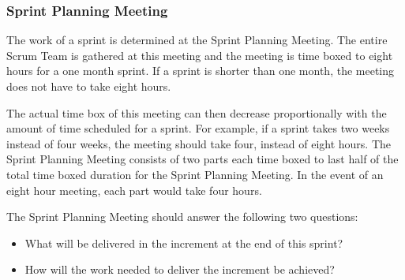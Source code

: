 \subsubsection{Sprint Planning Meeting}

The work of a sprint is determined at the Sprint Planning Meeting. The entire Scrum Team is 
gathered at this meeting and the meeting is time boxed to eight hours for a one
month sprint. If a sprint is shorter than one month, the meeting does not have
to take eight hours\cite{scrumguide11}. 


The actual time box of this meeting can then decrease proportionally with the amount of time 
scheduled for a sprint. For example, if a sprint takes two weeks instead of four
weeks, the meeting should take four, instead of eight
hours\cite{scrumguide11}.  The Sprint Planning Meeting consists of two parts each time boxed to last half of the total time boxed duration 
for the Sprint Planning Meeting. In the event of an eight hour meeting, each
part would take four hours\cite{scrumguide11}.


The Sprint Planning Meeting should answer the following two questions:

\begin{itemize}
	\item What will be delivered in the increment at the end of this sprint?
	\item	How will the work needed to deliver the increment be
	achieved?\cite{scrumguide11}
\end{itemize}



